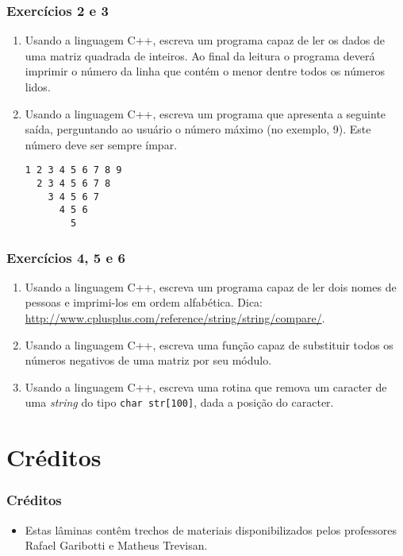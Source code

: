 \documentclass[aspectratio=169]{beamer}
\newcommand\setItemnumber[1]{\setcounter{enumi}{\numexpr#1-1\relax}}
\begin{document}
\begin{frame}[fragile]\frametitle{Exercícios 2 e 3}
\begin{enumerate}
	\setItemnumber{2}
	\item Usando a linguagem C++, escreva um programa capaz de ler os dados de uma matriz quadrada de inteiros. Ao final da leitura o programa deverá imprimir o número da linha que contém o menor dentre todos os números lidos.
		\item Usando a linguagem C++, escreva um programa que apresenta a seguinte saída, perguntando ao usuário o número máximo (no exemplo, 9). Este número deve ser sempre ímpar.
\begin{verbatim}
1 2 3 4 5 6 7 8 9
  2 3 4 5 6 7 8
    3 4 5 6 7
      4 5 6
        5
\end{verbatim}
\end{enumerate}
\end{frame}

\begin{frame}\frametitle{Exercícios 4, 5 e 6}
\begin{enumerate}
	\setItemnumber{4}
	\item Usando a linguagem C++, escreva um programa capaz de ler dois nomes de pessoas e imprimi-los em ordem alfabética. Dica: \url{http://www.cplusplus.com/reference/string/string/compare/}.
	\item Usando a linguagem C++, escreva uma função capaz de substituir todos os números negativos de uma matriz por seu módulo.
	\item Usando a linguagem C++, escreva uma rotina que remova um caracter de uma \emph{string} do tipo \texttt{char str[100]}, dada a posição do caracter.
\end{enumerate}
\end{frame}

\section{Créditos}

\begin{frame}\frametitle{Créditos}
\begin{itemize}
	\item Estas lâminas contêm trechos de materiais disponibilizados pelos professores Rafael Garibotti e Matheus Trevisan.
\end{itemize}
\end{frame}

\end{document}
